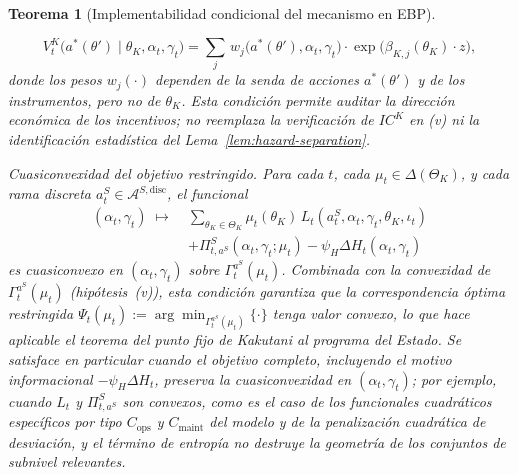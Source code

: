 \documentclass[review,authoryear,12pt]{elsarticle}
\theoremstyle{plain}
\newtheorem{theorem}{Teorema}
\theoremstyle{definition}
\newcommand{\ThetaK}{\Theta_K}
\newcommand{\1}{\mathbf{1}}
\begin{document}
\begin{theorem}[Implementabilidad condicional del mecanismo en EBP]
\begin{list}{}
  \[
    V^K_t\!\bigl(a^\ast(\theta')\mid\theta_K,\alpha_t,\gamma_t\bigr)
    =
    \sum_{j}\,w_j\!\bigl(a^\ast(\theta'),\alpha_t,\gamma_t\bigr)
    \cdot\exp\!\bigl(\beta_{K,j}(\theta_K)\cdot z\bigr),
  \]
  donde los pesos $w_j(\cdot)$ dependen de la senda de acciones $a^\ast(\theta')$ y de los instrumentos, pero no de $\theta_K$. Esta condición permite auditar la dirección económica de los incentivos; no reemplaza la verificación de $IC^K$ en \textup{(v)} ni la identificación estadística del Lema~\ref{lem:hazard-separation}.
  \item[\textup{(vii)}] Cuasiconvexidad del objetivo restringido. Para cada $t$, cada $\mu_t\in\Delta(\ThetaK)$, y cada rama discreta $a_t^S\in\mathcal{A}^{S,\mathrm{disc}}$, el funcional
  \[
  \begin{split}
  (\alpha_t,\gamma_t)\;\mapsto\;&\sum_{\theta_K\in\ThetaK}\mu_t(\theta_K)\,L_t(a_t^S,\alpha_t,\gamma_t,\theta_K,\iota_t) \\
  &+\Pi_{t,a^S}^S(\alpha_t,\gamma_t;\mu_t)
  -\psi_H\Delta H_t(\alpha_t,\gamma_t)
  \end{split}
  \]
  es cuasiconvexo en $(\alpha_t,\gamma_t)$ sobre $\Gamma_t^{a^S}(\mu_t)$. Combinada con la convexidad de $\Gamma_t^{a^S}(\mu_t)$ \textup{(}hipótesis~\textup{(v)}\textup{)}, esta condición garantiza que la correspondencia óptima restringida $\Psi_t(\mu_t):=\arg\min_{\Gamma_t^{a^S}(\mu_t)}\{\cdot\}$ tenga valor convexo, lo que hace aplicable el teorema del punto fijo de Kakutani al programa del Estado. Se satisface en particular cuando el objetivo completo, incluyendo el motivo informacional $-\psi_H\Delta H_t$, preserva la cuasiconvexidad en $(\alpha_t,\gamma_t)$; por ejemplo, cuando $L_t$ y $\Pi_{t,a^S}^S$ son convexos, como es el caso de los funcionales cuadráticos específicos por tipo $C_{\mathrm{ops}}$ y $C_{\mathrm{maint}}$ del modelo y de la penalización cuadrática de desviación, y el término de entropía no destruye la geometría de los conjuntos de subnivel relevantes.
\end{list}


\end{theorem}
\end{document}
